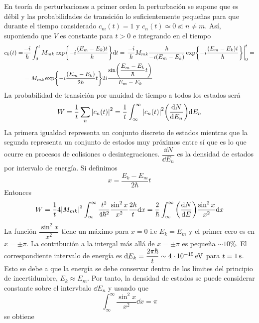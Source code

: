 En teoría de perturbaciones a primer orden la perturbación se supone que es débil y las probabilidades de transición lo suficientemente pequeñas para que durante el tiempo considerado $c_m(t)=1$ y $c_n(t)\simeq 0$ si $n\neq m$. Así, suponiendo que $V$ es constante para $t>0$ e integrando en el tiempo 
\begin{equation}
\begin{aligned}
        c_k(t)=& \frac{-i}{\hbar} \int^t_0 M_{mk} \exp{-i \frac{\qty(E_m-E_k)t}{\hbar}}\dd t=
        \left. \frac{-i}{\hbar} M_{mk} \frac{\hbar}{-i (E_m-E_k)}  \exp{-i \frac{\qty(E_m-E_k)t}{\hbar}}\right |^t_0= \\ &=M_{mk} \exp{-i \frac{\qty(E_m-E_k)}{2\hbar}t} 2i \frac{\sin(\dfrac{E_m-E_k}{\hbar}t)}{E_m-E_k}
\end{aligned}
\end{equation}
La probabilidad de transición por unuidad de tiempo a todos los estados será 
\begin{equation}
    W=\frac{1}{t} \sum_n \abs{c_n(t)}^2=\frac{1}{t} \int^\infty_\infty \abs{c_n(t)}^2 \qty(\dv{N}{E_n}) \dd E_n
    \label{eq: Probabilidad de transicion por unidad de tiempo}
\end{equation}
La primera igualdad representa un conjunto discreto de estados mientras que la segunda representa un conjunto de estados muy próximos entre sí que es lo que ocurre en procesos de colisiones o desintegraciones. $\dfrac{\dd N}{\dd E_n}$ es la densidad de estados por intervalo de energía. Si definimos 
\begin{equation}
    x=\frac{E_k-E_m}{2\hbar}t
\end{equation}
Entonces 
\begin{equation}
    W=\frac{1}{t} 4\abs{M_{mk}}^2 \int^\infty_\infty \frac{t^2}{4\hbar^2} \frac{\sin^2{x}}{x^2} \frac{2\hbar}{t} \dd x=\frac{2}{\hbar} \int^\infty_\infty \qty(\dv{N}{E}) \frac{\sin^2{x}}{x^2} \dd x
\end{equation}
La función $\dfrac{\sin^2{x}}{x^2}$ tiene un máximo para $x=0$ i.e $E_k=E_m$ y el primer cero es en $x=\pm \pi$. La contribución a la intergal más allá de $x=\pm \pi$ es pequeña $\sim 10\%$. El correspondiente intervalo de energía es $\dd E_k=\dfrac{2\pi \hbar}{t} \sim \unit[4 \cdot 10^{-15}]{eV}$ para $t=\unit[1]{s}$. Esto se debe a que la energía se debe conservar dentro de los límites del principio de incertidumbre, $E_k \approx E_m$. Por tanto, la densidad de estados se puede considerar constante sobre el intervbalo $\dd E_n$ y usando que $$\int^\infty_\infty \frac{\sin^2{x}}{x^2} \dd x =\pi $$ se obtiene 
